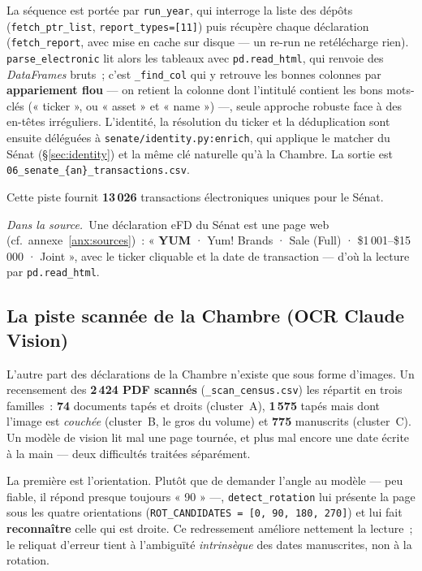 \documentclass[11pt,a4paper]{article}
\newcommand{\co}[1]{\texttt{\small #1}}
\newcommand{\srcex}[1]{\par\smallskip\noindent{\color{black!55}\rule{2pt}{\baselineskip}}\hspace{6pt}\begin{minipage}{\dimexpr\linewidth-16pt}\small\textit{Dans la source.}\ #1\end{minipage}\par\smallskip}
\begin{document}
La séquence est portée par \co{run_year}, qui interroge la liste des dépôts (\co{fetch_ptr_list},
\co{report_types=[11]}) puis récupère chaque déclaration (\co{fetch_report}, avec mise en cache sur disque —
un re-run ne retélécharge rien). \co{parse_electronic} lit alors les tableaux avec \co{pd.read_html}, qui
renvoie des \emph{DataFrames} bruts~; c'est \co{_find_col} qui y retrouve les bonnes colonnes par
\textbf{appariement flou} — on retient la colonne dont l'intitulé contient les bons mots-clés (« ticker »,
ou « asset » et « name ») —, seule approche robuste face à des en-têtes irréguliers. L'identité, la
résolution du ticker et la déduplication sont ensuite déléguées à \co{senate/identity.py:enrich}, qui
applique le matcher du Sénat (\S{}\ref{sec:identity}) et la même clé naturelle qu'à la Chambre. La sortie est
\co{06_senate_\{an\}_transactions.csv}.

Cette piste fournit \textbf{13\,026} transactions électroniques uniques pour le Sénat.

\srcex{Une déclaration eFD du Sénat est une page web (cf.~annexe~\ref{anx:sources})~: « \textbf{YUM} ·
Yum! Brands · Sale (Full) · \$1\,001--\$15\,000 · Joint », avec le ticker cliquable et la date de
transaction — d'où la lecture par \co{pd.read_html}.}

\subsection{La piste scannée de la Chambre (OCR Claude Vision)}
\label{sec:hocr}
L'autre part des déclarations de la Chambre n'existe que sous forme d'images. Un recensement des
\textbf{2\,424 PDF scannés} (\co{_scan_census.csv}) les répartit en trois familles~: \textbf{74} documents
tapés et droits (cluster~A), \textbf{1\,575} tapés mais dont l'image est \emph{couchée} (cluster~B, le gros
du volume) et \textbf{775} manuscrits (cluster~C). Un modèle de vision lit mal une page tournée, et plus mal
encore une date écrite à la main — deux difficultés traitées séparément.

La première est l'orientation. Plutôt que de demander l'angle au modèle — peu fiable, il répond presque
toujours « 90 » —, \co{detect_rotation} lui présente la page sous les quatre orientations
(\co{ROT_CANDIDATES = [0, 90, 180, 270]}) et lui fait \textbf{reconnaître} celle qui est droite. Ce
redressement améliore nettement la lecture~; le reliquat d'erreur tient à l'ambiguïté \emph{intrinsèque} des
dates manuscrites, non à la rotation.
\end{document}
